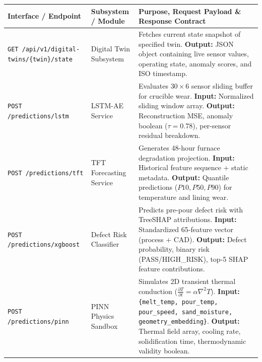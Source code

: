 \documentclass[11pt, a4paper]{article}
\begin{document}
\begin{table}[H]
    \centering
    \footnotesize
    \renewcommand{\arraystretch}{1.25}
    \begin{tabular}{|p{3.8cm}|p{3.6cm}|p{6.4cm}|}
        \hline
        \textbf{Interface / Endpoint} & \textbf{Subsystem / Module} & \textbf{Purpose, Request Payload \& Response Contract} \\
        \hline
        \texttt{GET /api/v1/digital-twins/\{twin\}/state} & Digital Twin Subsystem & Fetches current state snapshot of specified twin. \newline \textbf{Output:} JSON object containing live sensor values, operating state, anomaly scores, and ISO timestamp. \\
        \hline
        \texttt{POST /predictions/lstm} & LSTM-AE Service & Evaluates $30 \times 6$ sensor sliding buffer for crucible wear. \newline \textbf{Input:} Normalized sliding window array. \newline \textbf{Output:} Reconstruction MSE, anomaly boolean ($\tau = 0.78$), per-sensor residual breakdown. \\
        \hline
        \texttt{POST /predictions/tft} & TFT Forecasting Service & Generates 48-hour furnace degradation projection. \newline \textbf{Input:} Historical feature sequence + static metadata. \newline \textbf{Output:} Quantile predictions ($P10, P50, P90$) for temperature and lining wear. \\
        \hline
        \texttt{POST /predictions/xgboost} & Defect Risk Classifier & Predicts pre-pour defect risk with TreeSHAP attributions. \newline \textbf{Input:} Standardized 65-feature vector (process + CAD). \newline \textbf{Output:} Defect probability, binary risk (PASS/HIGH\_RISK), top-5 SHAP feature contributions. \\
        \hline
        \texttt{POST /predictions/pinn} & PINN Physics Sandbox & Simulates 2D transient thermal conduction ($\frac{\partial T}{\partial t} = \alpha \nabla^2 T$). \newline \textbf{Input:} \texttt{\{melt\_temp, pour\_temp, pour\_speed, sand\_moisture, geometry\_embedding\}}. \newline \textbf{Output:} Thermal field array, cooling rate, solidification time, thermodynamic validity boolean. \\
        \hline

\end{tabular}
\end{table}
\end{document}
